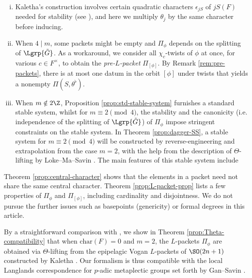 \documentclass[a4paper,10pt]{article}
\begin{document}
\begin{enumerate}[(i)]
	\item Kaletha's construction involves certain quadratic characters $\epsilon_{jS}$ of $jS(F)$ needed for stability (see \cite[\S 4.6]{Kal15}), and here we multiply $\theta_j$ by the same character before inducing.
	\item When $4 \mid m$, some packets might be empty and $\Pi_\phi$ depends on the splitting of $\Lgrp{\tilde{G}}$. As a workaround, we consider all $\chi_c$-twists of $\phi$ at once, for various $c \in F^\times$, to obtain the \emph{pre-$L$-packet} $\Pi_{[\phi]}$. By Remark \ref{rem:pre-packets}, there is at most one datum in the orbit $[\phi]$ under twists that yields a nonempty $\Pi(S, \theta^\flat)$.
	\item When $m \notin 2\Z$, Proposition \ref{prop:std-stable-system} furnishes a standard stable system, whilst for $m \equiv 2 \pmod 4$, the stability and the canonicity (i.e. independence of the splitting of $\Lgrp{\tilde{G}}$) of $\Pi_\phi$ impose stringent constraints on the stable system. In Theorem \ref{prop:dagger-SS}, a stable system for $m \equiv 2 \pmod 4$ will be constructed by reverse-engineering and extrapolation from the case $m=2$, with the help from the description of $\Theta$-lifting by Loke--Ma--Savin \cite{LMS16,LM}. The main features of this stable system include
\end{enumerate}
Theorem \ref{prop:central-character} shows that the elements in a packet need not share the same central character. Theorem \ref{prop:L-packet-prop} lists a few properties of $\Pi_\phi$ and $\Pi_{[\phi]}$, including cardinality and disjointness. We do not pursue the further issues such as basepoints (genericity) or formal degrees in this article.

By a straightforward comparison with \cite{LMS16}, we show in Theorem \ref{prop:Theta-compatibility} that when $\text{char}(F)=0$ and $m=2$, the $L$-packets $\Pi_\phi$ are obtained via $\Theta$-lifting from the epipelagic Vogan $L$-packets of $\SO(2n+1)$ constructed by Kaletha \cite{Kal15}. Our formalism is thus compatible with the local Langlands correspondence for $p$-adic metaplectic groups set forth by Gan--Savin \cite{GS1}.
\end{document}
